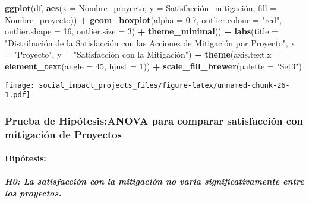 \documentclass[
]{article}
\newenvironment{Shaded}{\begin{snugshade}}{\end{snugshade}}
\newcommand{\AttributeTok}[1]{\textcolor[rgb]{0.13,0.29,0.53}{#1}}
\newcommand{\DecValTok}[1]{\textcolor[rgb]{0.00,0.00,0.81}{#1}}
\newcommand{\FloatTok}[1]{\textcolor[rgb]{0.00,0.00,0.81}{#1}}
\newcommand{\FunctionTok}[1]{\textcolor[rgb]{0.13,0.29,0.53}{\textbf{#1}}}
\newcommand{\NormalTok}[1]{#1}
\newcommand{\SpecialCharTok}[1]{\textcolor[rgb]{0.81,0.36,0.00}{\textbf{#1}}}
\newcommand{\StringTok}[1]{\textcolor[rgb]{0.31,0.60,0.02}{#1}}
\begin{document}
\begin{Shaded}
\begin{Highlighting}[]
\FunctionTok{ggplot}\NormalTok{(df, }\FunctionTok{aes}\NormalTok{(}\AttributeTok{x =}\NormalTok{ Nombre\_proyecto, }\AttributeTok{y =}\NormalTok{ Satisfacción\_mitigación, }\AttributeTok{fill =}\NormalTok{ Nombre\_proyecto)) }\SpecialCharTok{+}
  \FunctionTok{geom\_boxplot}\NormalTok{(}\AttributeTok{alpha =} \FloatTok{0.7}\NormalTok{, }\AttributeTok{outlier.colour =} \StringTok{"red"}\NormalTok{, }\AttributeTok{outlier.shape =} \DecValTok{16}\NormalTok{, }\AttributeTok{outlier.size =} \DecValTok{3}\NormalTok{) }\SpecialCharTok{+} 
  \FunctionTok{theme\_minimal}\NormalTok{() }\SpecialCharTok{+}
  \FunctionTok{labs}\NormalTok{(}\AttributeTok{title =} \StringTok{"Distribución de la Satisfacción con las Acciones de Mitigación por Proyecto"}\NormalTok{,}
       \AttributeTok{x =} \StringTok{"Proyecto"}\NormalTok{,}
       \AttributeTok{y =} \StringTok{"Satisfacción con la Mitigación"}\NormalTok{) }\SpecialCharTok{+}
  \FunctionTok{theme}\NormalTok{(}\AttributeTok{axis.text.x =} \FunctionTok{element\_text}\NormalTok{(}\AttributeTok{angle =} \DecValTok{45}\NormalTok{, }\AttributeTok{hjust =} \DecValTok{1}\NormalTok{)) }\SpecialCharTok{+} 
  \FunctionTok{scale\_fill\_brewer}\NormalTok{(}\AttributeTok{palette =} \StringTok{"Set3"}\NormalTok{)}
\end{Highlighting}
\end{Shaded}

\texttt{[image: social\_impact\_projects\_files/figure-latex/unnamed-chunk-26-1.pdf]}

\subsubsection{\texorpdfstring{\textbf{Prueba de Hipótesis:}ANOVA para
comparar satisfacción con mitigación de
Proyectos}{Prueba de Hipótesis:ANOVA para comparar satisfacción con mitigación de Proyectos}}\label{prueba-de-hipuxf3tesisanova-para-comparar-satisfacciuxf3n-con-mitigaciuxf3n-de-proyectos}

\paragraph{Hipótesis:}\label{hipuxf3tesis-4}

\subparagraph{H0: La satisfacción con la mitigación no varía
significativamente entre los
proyectos.}\label{h0-la-satisfacciuxf3n-con-la-mitigaciuxf3n-no-varuxeda-significativamente-entre-los-proyectos.}
\end{document}
